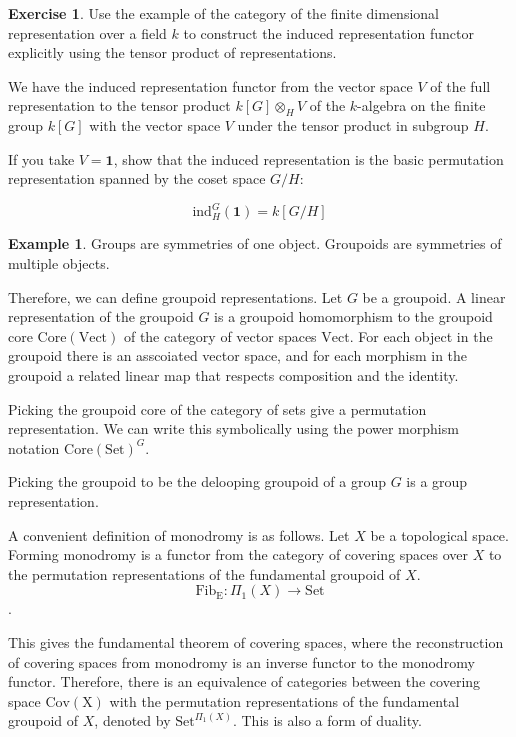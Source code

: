 \documentclass[10pt]{article}
\theoremstyle{plain}%
\theoremstyle{definition}
\newtheorem{example}{Example}[section]
\newtheorem{exercise}{Exercise}[section]
\theoremstyle{remark}
\begin{document}
\begin{exercise}
	Use the example of the category of the finite dimensional representation over a field $k$ to construct the induced representation functor explicitly using the tensor product of representations.

	We have the induced representation functor from the vector space $V$ of the full representation to the tensor product $k[G] \otimes_H V$ of the $k$-algebra on the finite group $k[G]$ with the vector space $V$ under the tensor product in subgroup $H$.
	
	If you take $V = \mathbf{1}$, show that the induced representation is the basic permutation representation spanned by the coset space $G/H$:

	\begin{equation}
		\mathrm{ind}_H^{G} (\mathbf{1})
		= k[G / H]
	\end{equation}

\end{exercise}

\begin{example}
	Groups are symmetries of one object. Groupoids are symmetries of multiple objects.

	Therefore, we can define groupoid representations. Let $G$ be a groupoid. A linear representation of the groupoid $G$ is a groupoid homomorphism to the groupoid core $\mathrm{Core(Vect)}$ of the category of vector spaces $\mathrm{Vect}$. For each object in the groupoid there is an asscoiated vector space, and for each morphism in the groupoid a related linear map that respects composition and the identity.

	Picking the groupoid core of the category of sets give a permutation representation. We can write this symbolically using the power morphism notation $\mathrm{Core(Set)}^{G}$.

	Picking the groupoid to be the delooping groupoid of a group $G$ is a group representation.

	A convenient definition of monodromy is as follows. Let $X$ be a topological space. Forming monodromy is a functor from the category of covering spaces over $X$ to the permutation representations of the fundamental groupoid of $X$.
	\begin{equation}
		\mathrm{Fib_{E}} : \Pi_1(X) \rightarrow \mathrm{Set}
	\end{equation}.

	This gives the fundamental theorem of covering spaces, where the reconstruction of covering spaces from monodromy is an inverse functor to the monodromy functor. Therefore, there is an equivalence of categories between the covering space $\mathrm{Cov(X)}$ with the permutation representations of the fundamental groupoid of $X$, denoted by $\mathrm{Set}^{\Pi_1(X)}$. This is also a form of duality.
\end{example}
\end{document}
